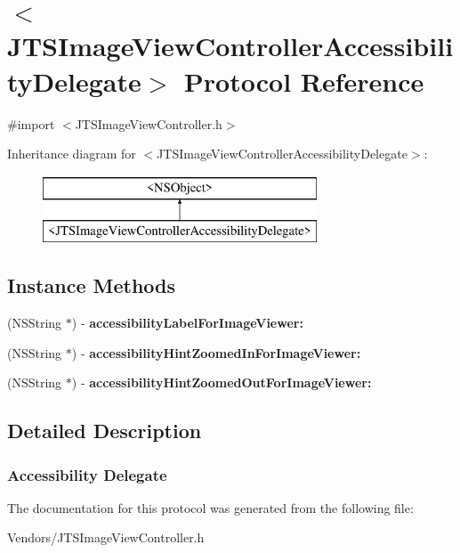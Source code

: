 \hypertarget{protocol_j_t_s_image_view_controller_accessibility_delegate-p}{}\section{$<$J\+T\+S\+Image\+View\+Controller\+Accessibility\+Delegate$>$ Protocol Reference}
\label{protocol_j_t_s_image_view_controller_accessibility_delegate-p}


{\ttfamily \#import $<$J\+T\+S\+Image\+View\+Controller.\+h$>$}

Inheritance diagram for $<$J\+T\+S\+Image\+View\+Controller\+Accessibility\+Delegate$>$\+:\begin{figure}[H]
\begin{center}
\leavevmode
\includegraphics[height=2.000000cm]{protocol_j_t_s_image_view_controller_accessibility_delegate-p}
\end{center}
\end{figure}
\subsection*{Instance Methods}
\begin{DoxyCompactItemize}
\item 
\hypertarget{protocol_j_t_s_image_view_controller_accessibility_delegate-p_a86441b7379545c8ecbce52b2259c981d}{}(N\+S\+String $\ast$) -\/ {\bfseries accessibility\+Label\+For\+Image\+Viewer\+:}\label{protocol_j_t_s_image_view_controller_accessibility_delegate-p_a86441b7379545c8ecbce52b2259c981d}

\item 
\hypertarget{protocol_j_t_s_image_view_controller_accessibility_delegate-p_a9f5266ae6f305afb55eb52d1276fede6}{}(N\+S\+String $\ast$) -\/ {\bfseries accessibility\+Hint\+Zoomed\+In\+For\+Image\+Viewer\+:}\label{protocol_j_t_s_image_view_controller_accessibility_delegate-p_a9f5266ae6f305afb55eb52d1276fede6}

\item 
\hypertarget{protocol_j_t_s_image_view_controller_accessibility_delegate-p_ad1ce8c853e0c77b3e1fea6bcd7532fce}{}(N\+S\+String $\ast$) -\/ {\bfseries accessibility\+Hint\+Zoomed\+Out\+For\+Image\+Viewer\+:}\label{protocol_j_t_s_image_view_controller_accessibility_delegate-p_ad1ce8c853e0c77b3e1fea6bcd7532fce}

\end{DoxyCompactItemize}


\subsection{Detailed Description}


 \subsubsection*{Accessibility Delegate }

The documentation for this protocol was generated from the following file\+:\begin{DoxyCompactItemize}
\item 
Vendors/J\+T\+S\+Image\+View\+Controller.\+h\end{DoxyCompactItemize}
